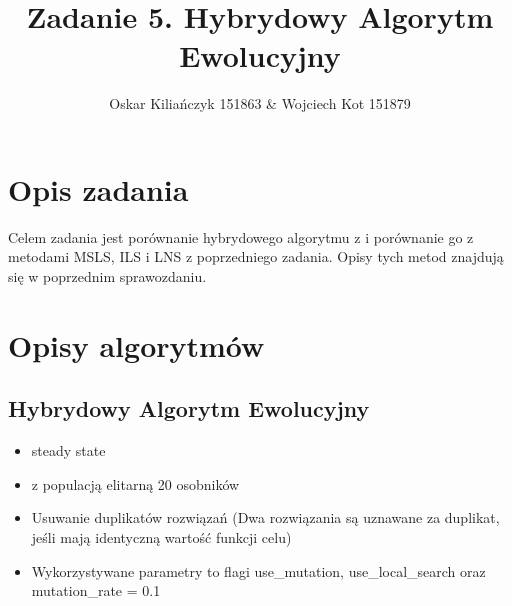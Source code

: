 \documentclass[11pt]{article}
\title{Zadanie 5. Hybrydowy Algorytm Ewolucyjny}
\author{Oskar Kiliańczyk 151863 \& Wojciech Kot 151879}
\date{}
\begin{document}
\maketitle
\newpage

\section{Opis zadania}\label{sec:opis-zadania}

Celem zadania jest porównanie hybrydowego algorytmu z  i porównanie go z metodami
MSLS, ILS i LNS z poprzedniego zadania.
Opisy tych metod znajdują się w poprzednim sprawozdaniu.

\section{Opisy algorytmów}\label{sec:opisy-alg}

\subsection{Hybrydowy Algorytm Ewolucyjny}\label{subsec:hybrydowy-algorytm-ewolucyjny}
\begin{itemize}
    \item steady state
    \item z populacją elitarną 20 osobników
    \item Usuwanie duplikatów rozwiązań (Dwa rozwiązania są uznawane za duplikat, jeśli mają identyczną wartość funkcji celu)
    \item Wykorzystywane parametry to flagi use\_mutation, use\_local\_search oraz mutation\_rate = 0.1
\end{itemize}
\end{document}
